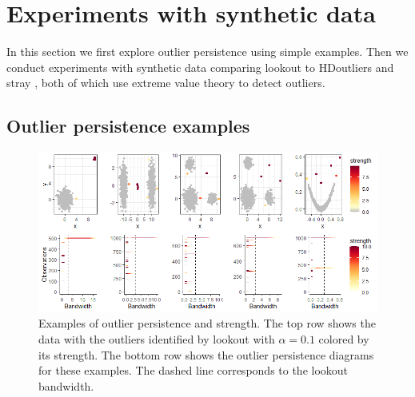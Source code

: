 \documentclass[letter,12pt]{article}
\begin{document}


\section{Experiments with synthetic data}\label{sec:simulations}
In this section we first explore outlier persistence using simple examples. %
Then we conduct experiments with synthetic data comparing lookout to HDoutliers \citep{wilkinson2017visualizing} and stray \citep{pridiltal}, both of which use extreme value theory to detect outliers. 

\subsection{Outlier persistence examples}\label{sec:PersistenceExamples}
\begin{figure}[!ht]
    \centering
    \includegraphics[scale=0.7]{Graphics/Persistence_Ex1.png}
    \caption{Examples of outlier persistence and strength. The top row shows the data with the outliers identified by lookout with $\alpha = 0.1$ colored by its strength. The bottom row shows the outlier persistence diagrams for these examples. The dashed line corresponds to the lookout bandwidth. }
    \label{fig:persistenceExamples}
\end{figure}
\end{document}
